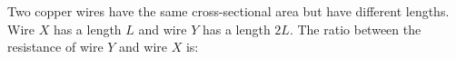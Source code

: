 Two copper wires have the same cross-sectional area but have different 
lengths. 
Wire $X$ has a length $L$ and wire $Y$ has a length $2L$. 
The ratio between the resistance of wire $Y$ and wire $X$ is: